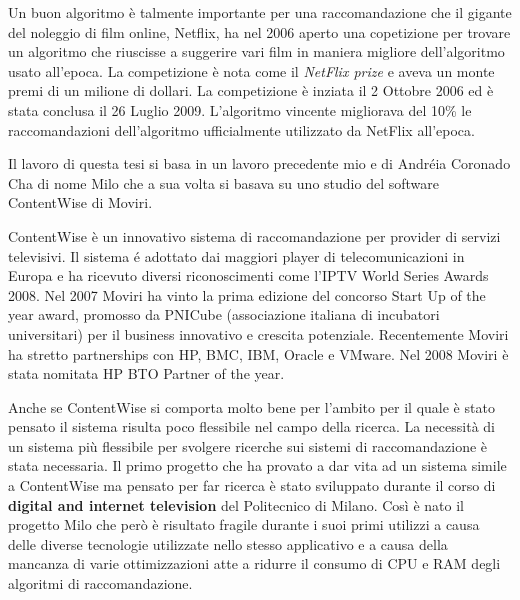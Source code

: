 Un buon algoritmo \`e talmente importante per una raccomandazione che il gigante del noleggio di film online, Netflix, ha nel 2006 aperto una copetizione per trovare un algoritmo che riuscisse a suggerire vari film in maniera migliore dell'algoritmo usato all'epoca. La competizione \`e nota come il \textit{NetFlix prize} \cite{netflixprize} e aveva un monte premi di un milione di dollari. La competizione \`e inziata il 2 Ottobre 2006 ed \`e stata conclusa il 26 Luglio 2009. L'algoritmo vincente migliorava del 10\% le raccomandazioni dell'algoritmo ufficialmente utilizzato da NetFlix all'epoca.

Il lavoro di questa tesi si basa in un lavoro precedente mio e di Andr\'eia Coronado Cha di nome Milo che a sua volta si basava su uno studio del software ContentWise \cite{ContentWise} di Moviri.

ContentWise \`e un innovativo sistema di raccomandazione per provider di servizi televisivi. Il sistema \'e adottato dai maggiori player di telecomunicazioni in Europa e ha ricevuto diversi riconoscimenti come l'IPTV World Series Awards 2008. Nel 2007 Moviri ha vinto la prima edizione del concorso Start Up of the year award, promosso da PNICube (associazione italiana di incubatori universitari) per il business innovativo e crescita potenziale. Recentemente Moviri ha stretto partnerships con HP, BMC, IBM, Oracle e VMware. Nel 2008 Moviri \`e stata nomitata HP BTO Partner of the year.

Anche se ContentWise si comporta molto bene per l'ambito per il quale \`e stato pensato il sistema risulta poco flessibile nel campo della ricerca. La necessit\`a di un sistema pi\`u flessibile per svolgere ricerche sui sistemi di raccomandazione \`e stata necessaria. Il primo progetto che ha provato a dar vita ad un sistema simile a ContentWise ma pensato per far ricerca \`e stato sviluppato durante il corso di \textbf{digital and internet television} del Politecnico di Milano. Cos\`i \`e nato il progetto Milo che per\`o \`e risultato fragile durante i suoi primi utilizzi a causa delle diverse tecnologie utilizzate nello stesso applicativo e a causa della mancanza di varie ottimizzazioni atte a ridurre il consumo di CPU e RAM degli algoritmi di raccomandazione.

